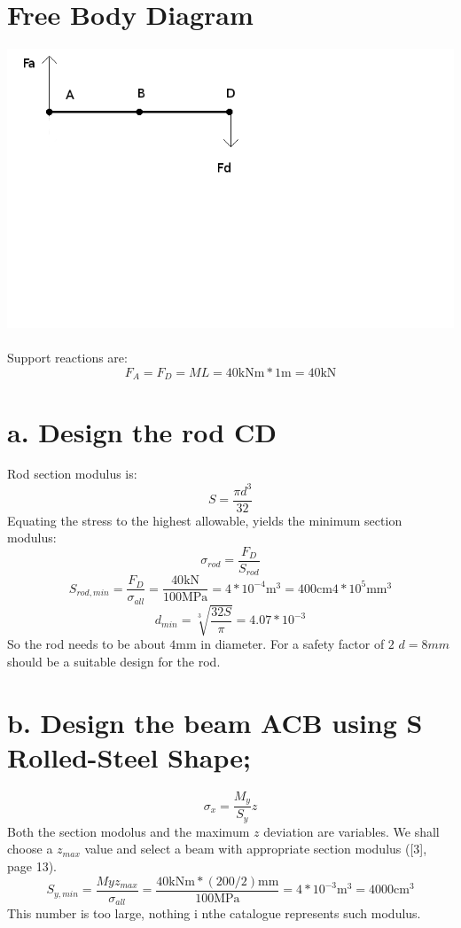 \documentclass{article}
\begin{document}
\section{Free Body Diagram}
\includegraphics[width=1\textwidth]{images/fbd}~
\\
Support reactions are:
$$ F_A = F_D = M L = 40\si{\kilo\newton\meter} * 1\si{\meter} = 40\si{\kilo\newton} $$

\section{a. Design the rod CD}
Rod section modulus is:
$$ S = \frac{\pi d^3}{32} $$
Equating the stress to the highest allowable, yields the minimum section modulus:
$$ \sigma_{rod} = \frac{F_D}{S_{rod}}  $$
$$ S_{rod, min} = \frac{F_D}{\sigma_{all}} = \frac{40\si{\kilo\newton}}{100\si{\mega\pascal}} = 4 * 10^{-4} \si{\meter}^3 = 400 \si{\centi\meter} 4 * 10^5 \si{\milli\meter}^3$$
$$ d_{min} = \sqrt[3]{\frac{32 S}{\pi}} = 4.07 * 10^{-3} $$
So the rod needs to be about $4\si{\milli\meter}$ in diameter.
For a safety factor of $2$ $d=8mm$ should be a suitable design for the rod.

\section{b. Design the beam ACB using S Rolled-Steel Shape;}
$$ \sigma_x = \frac{M_y}{S_y}z $$
Both the section modolus and the maximum $z$ deviation are variables.
We shall choose a $z_{max}$ value and select a beam with appropriate section modulus ([3], page 13).
$$ S_{y, min}  = \frac{My z_{max}}{\sigma_{all}} = \frac{40\si{\kilo\newton\meter} * (200/2)\si{\milli\meter}}{100\si{\mega\pascal}} = 4 * 10^{-3}\si{\meter}^3 = 4000\si{\centi\meter}^3 $$
This number is too large, nothing i nthe catalogue represents such modulus.
\end{document}
